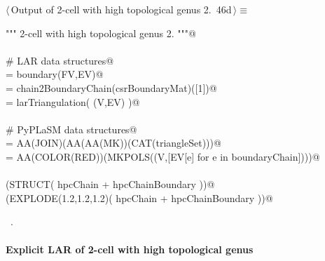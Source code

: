 \documentclass[11pt,oneside]{article}    %
\begin{document}
\begin{flushleft} \small \label{scrap77}
\protect{}$\langle\,$Output of 2-cell with high topological genus 2.\nobreak\ {\footnotesize 46d}$\,\rangle\equiv$
\vspace{-1ex}
\begin{list}{}{} \item
\mbox{}\verb@""" 2-cell with high topological genus 2. """@\\
\mbox{}\verb@@\\
\mbox{}\verb@# LAR data structures@\\
\mbox{}\verb@csrBoundaryMat = boundary(FV,EV)@\\
\mbox{}\verb@boundaryChain = chain2BoundaryChain(csrBoundaryMat)([1])@\\
\mbox{}\verb@triangleSet = larTriangulation( (V,EV) )@\\
\mbox{}\verb@@\\
\mbox{}\verb@# PyPLaSM data structures@\\
\mbox{}\verb@hpcChain = AA(JOIN)(AA(AA(MK))(CAT(triangleSet)))@\\
\mbox{}\verb@hpcChainBoundary = AA(COLOR(RED))(MKPOLS((V,[EV[e] for e in boundaryChain])))@\\
\mbox{}\verb@@\\
\mbox{}\verb@VIEW(STRUCT( hpcChain + hpcChainBoundary ))@\\
\mbox{}\verb@VIEW(EXPLODE(1.2,1.2,1.2)( hpcChain + hpcChainBoundary ))@\\
\mbox{}\verb@@{\NWsep}
\end{list}
\vspace{-1ex}
\footnotesize\addtolength{\baselineskip}{-1ex}
\begin{list}{}{\setlength{\itemsep}{-\parsep}\setlength{\itemindent}{-\leftmargin}}
\item \NWtxtMacroRefIn\ .
\end{list}
\end{flushleft}

\paragraph{Explicit LAR of 2-cell with high topological genus}
\end{document}
